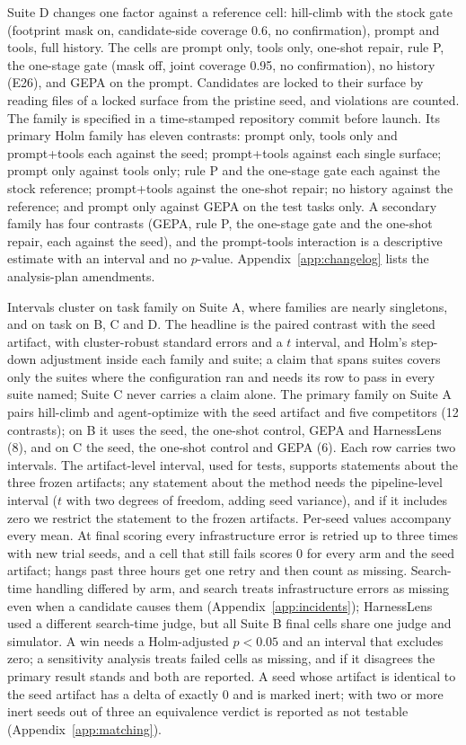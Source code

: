 Suite D changes one factor against a reference cell: hill-climb with the stock gate (footprint mask on, candidate-side coverage 0.6, no confirmation), prompt and tools, full history. The cells are prompt only, tools only, one-shot repair, rule P, the one-stage gate (mask off, joint coverage 0.95, no confirmation), no history (E26), and GEPA on the prompt. Candidates are locked to their surface by reading files of a locked surface from the pristine seed, and violations are counted. The family is specified in a time-stamped repository commit before launch. Its primary Holm family has eleven contrasts: prompt only, tools only and prompt+tools each against the seed; prompt+tools against each single surface; prompt only against tools only; rule P and the one-stage gate each against the stock reference; prompt+tools against the one-shot repair; no history against the reference; and prompt only against GEPA on the test tasks only. A secondary family has four contrasts (GEPA, rule P, the one-stage gate and the one-shot repair, each against the seed), and the prompt-tools interaction is a descriptive estimate with an interval and no $p$-value. Appendix~\ref{app:changelog} lists the analysis-plan amendments.

Intervals cluster on task family on Suite A, where families are nearly singletons, and on task on B, C and D. The headline is the paired contrast with the seed artifact, with cluster-robust standard errors and a $t$ interval, and Holm's step-down adjustment inside each family and suite; a claim that spans suites covers only the suites where the configuration ran and needs its row to pass in every suite named; Suite C never carries a claim alone. The primary family on Suite A pairs hill-climb and agent-optimize with the seed artifact and five competitors (12 contrasts); on B it uses the seed, the one-shot control, GEPA and HarnessLens (8), and on C the seed, the one-shot control and GEPA (6). Each row carries two intervals. The artifact-level interval, used for tests, supports statements about the three frozen artifacts; any statement about the method needs the pipeline-level interval ($t$ with two degrees of freedom, adding seed variance), and if it includes zero we restrict the statement to the frozen artifacts. Per-seed values accompany every mean. At final scoring every infrastructure error is retried up to three times with new trial seeds, and a cell that still fails scores 0 for every arm and the seed artifact; hangs past three hours get one retry and then count as missing. Search-time handling differed by arm, and search treats infrastructure errors as missing even when a candidate causes them (Appendix~\ref{app:incidents}); HarnessLens used a different search-time judge, but all Suite B final cells share one judge and simulator. A win needs a Holm-adjusted $p<0.05$ and an interval that excludes zero; a sensitivity analysis treats failed cells as missing, and if it disagrees the primary result stands and both are reported. A seed whose artifact is identical to the seed artifact has a delta of exactly 0 and is marked inert; with two or more inert seeds out of three an equivalence verdict is reported as not testable (Appendix~\ref{app:matching}).

